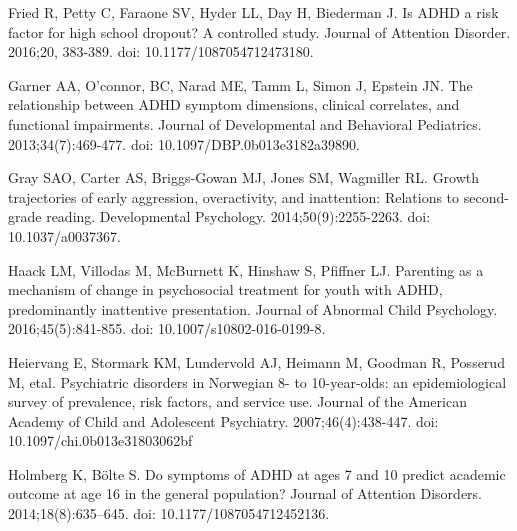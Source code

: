 \documentclass[10pt,letterpaper]{article}
\begin{document}
{{\begin{thebibliography}{10}
 Fried R, Petty C, Faraone SV, Hyder LL, Day H, Biederman J.
\newblock Is ADHD a risk factor for high school dropout? A controlled
study. 
 \newblock Journal of Attention Disorder. 2016;20, 383-389. doi: 10.1177/1087054712473180.
 
 
Garner AA, O'connor, BC, Narad ME, Tamm L, Simon J,
 Epstein JN.
\newblock The relationship between {ADHD} symptom dimensions, clinical
  correlates, and functional impairments.
\newblock Journal of Developmental and Behavioral Pediatrics. 2013;34(7):469-477. doi: 10.1097/DBP.0b013e3182a39890.


Gray SAO, Carter AS, Briggs-Gowan MJ, Jones SM,
Wagmiller RL.
\newblock Growth trajectories of early aggression, overactivity, and
  inattention: Relations to second-grade reading.
\newblock Developmental Psychology. 2014;50(9):2255-2263. doi: 10.1037/a0037367. 

Haack LM, Villodas M, McBurnett K, Hinshaw S, Pfiffner LJ.
\newblock Parenting as a mechanism of change in psychosocial treatment for
  youth with {ADHD}, predominantly inattentive presentation.
\newblock Journal of Abnormal Child Psychology. 2016;45(5):841-855. doi: 10.1007/s10802-016-0199-8.


Heiervang E, Stormark KM, Lundervold AJ, Heimann M, Goodman R, Posserud M, etal.  
\newblock Psychiatric disorders in {N}orwegian 8- to 10-year-olds: an
  epidemiological survey of prevalence, risk factors, and service use.
\newblock Journal of the American Academy of Child and Adolescent
  Psychiatry. 2007;46(4):438-447. doi: 10.1097/chi.0b013e31803062bf

Holmberg K, {B\"{o}lte} S.
\newblock Do symptoms of {ADHD} at ages 7 and 10 predict academic outcome at
  age 16 in the general population?
\newblock Journal of Attention Disorders. 2014;18(8):635--645. doi: 10.1177/1087054712452136.


\end{thebibliography}}}
\end{document}
